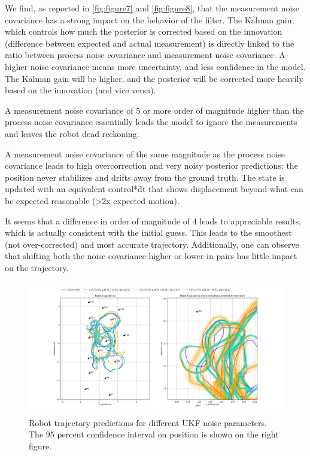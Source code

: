 \documentclass{article}
\begin{document}
We find, as reported in \ref{fig:figure7} and \ref{fig:figure8}, that the measurement noise covariance has a strong impact on the behavior of the filter. The Kalman gain, which controls how much the posterior is corrected based on the innovation (difference between expected and actual measurement) is directly linked to the ratio between process noise covariance and measurement noise covariance. A higher noise covariance means more uncertainty, and less confidence in the model. The Kalman gain will be higher, and the posterior will be corrected more heavily based on the innovation (and vice versa).

A measurement noise covariance of 5 or more order of magnitude higher than the process noise covariance essentially leads the model to ignore the measurements and leaves the robot dead reckoning.

A measurement noise covariance of the same magnitude as the process noise covariance leads to high overcorrection and very noisy posterior predictions: the position never stabilizes and drifts away from the ground truth. The state is updated with an equivalent control*dt that shows displacement beyond what can be expected reasonable (>2x expected motion).

It seems that a difference in order of magnitude of 4 leads to appreciable results, which is actually consistent with the initial guess. This leads to the smoothest (not over-corrected) and most accurate trajectory. Additionally, one can observe that shifting both the noise covariance higher or lower in pairs has little impact on the trajectory.

\begin{figure}
\centering
\includegraphics[width=\textwidth]{Figure_6.png}
\caption{Robot trajectory predictions for different UKF noise parameters. The 95 percent confidence interval on position is shown on the right figure.}
\label{fig:figure6}
\end{figure}
\end{document}

